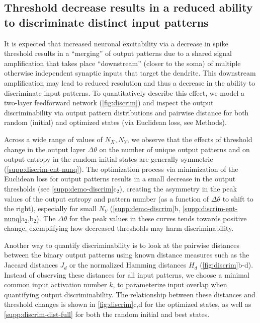 \subsection{Threshold decrease results in a reduced ability to discriminate distinct input patterns}

It is expected that increased neuronal excitability via a decrease in spike threshold
        results in a ``merging'' of output patterns due to a shared signal amplification
            that takes place ``downstream'' (closer to the soma) of multiple otherwise independent synaptic inputs that target the dendrite.
    This downstream amplification may lead to reduced resolution
        and thus a decrease in the ability to discriminate input patterns.
    To quantitatively describe this effect, we model a two-layer feedforward network (\autoref{fig:discrim})
        and inspect the output discriminability via output pattern distributions
        and pairwise distance for both random (initial) and optimized states (via Euclidean loss, see Methods).

Across a wide range of values of $N_X, N_Y$, we observe that
        the effects of threshold change in the output layer $\Delta \theta$
        on the number of unique output patterns and on output entropy
        in the random initial states
        are generally symmetric (\autoref{supp:discrim-ent-nunq}).
    The optimization process via minimization of the Euclidean loss for output patterns
        results in a small decrease in the output thresholds (see \autoref{supp:demo-discrim}c$_2$),
        creating the asymmetry in the peak values of the output entropy and pattern number
            (as a function of $\Delta \theta$ to shift to the right),
        especially for small $N_Y$
        (\autoref{supp:demo-discrim}b,
        \autoref{supp:discrim-ent-nunq}a$_2$,b$_2$).
    The $\Delta \theta$ for the peak values in these curves tends towards positive change,
        exemplifying how decreased thresholds may harm discriminability.



Another way to quantify discriminability is to look at the pairwise distances between the binary output patterns
        using known distance measures such as
            the Jaccard distances $J_d$
            or the normalized Hamming distances $H_d$
            (\autoref{fig:discrim}b-d).
    Instead of observing these distances for all input patterns, we choose
        a minimal common input activation number $k$,
        to parameterize input overlap when quantifying output discriminability.
    The relationship between these distances and threshold changes is shown in \autoref{fig:discrim}c,d for the optimized states,
        as well as \autoref{supp:discrim-dist-full} for both the random initial and best states.

